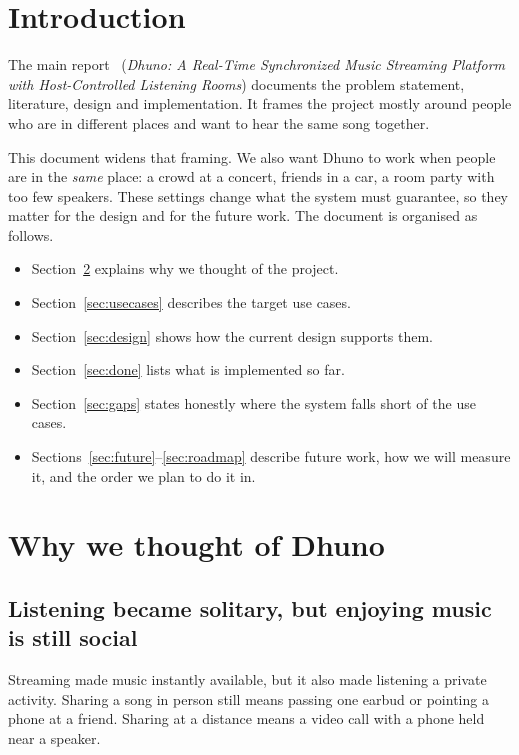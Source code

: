 \documentclass[11pt,a4paper]{article}
\begin{document}
\setcounter{tocdepth}{1}
\tableofcontents
\newpage

\section{Introduction}
The main report~\cite{main} (\emph{Dhuno: A Real-Time Synchronized Music Streaming Platform with
Host-Controlled Listening Rooms}) documents the problem statement, literature, design and
implementation. It frames the project mostly around people who are in different places and
want to hear the same song together.

This document widens that framing. We also want Dhuno to work when people are in the
\emph{same} place: a crowd at a concert, friends in a car, a room party with too few
speakers. These settings change what the system must guarantee, so they matter for the
design and for the future work. The document is organised as follows.

\begin{itemize}
  \item Section~\ref{sec:why} explains why we thought of the project.
  \item Section~\ref{sec:usecases} describes the target use cases.
  \item Section~\ref{sec:design} shows how the current design supports them.
  \item Section~\ref{sec:done} lists what is implemented so far.
  \item Section~\ref{sec:gaps} states honestly where the system falls short of the use cases.
  \item Sections~\ref{sec:future}--\ref{sec:roadmap} describe future work, how we will
        measure it, and the order we plan to do it in.
\end{itemize}

\section{Why we thought of Dhuno}\label{sec:why}
\subsection{Listening became solitary, but enjoying music is still social}
Streaming made music instantly available, but it also made listening a private activity.
Sharing a song in person still means passing one earbud or pointing a phone at a friend.
Sharing at a distance means a video call with a phone held near a speaker.
\end{document}

